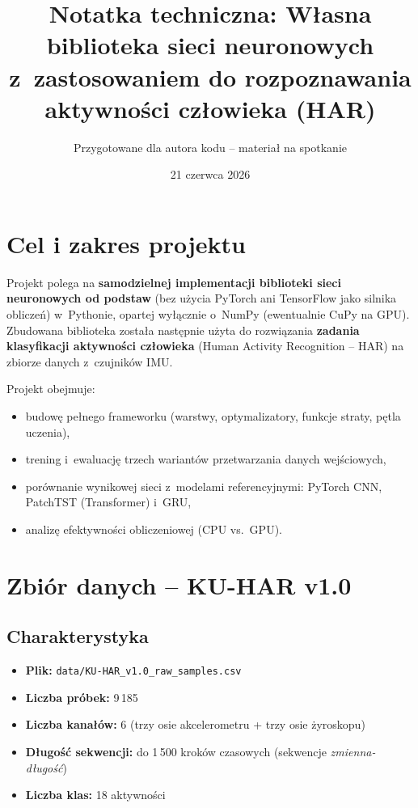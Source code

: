 \documentclass[12pt,a4paper]{article}
\title{\textbf{Notatka techniczna: Własna biblioteka sieci neuronowych\\
z~zastosowaniem do rozpoznawania aktywności człowieka (HAR)}}
\author{Przygotowane dla autora kodu -- materiał na spotkanie}
\date{21 czerwca 2026}
\begin{document}
\maketitle
\tableofcontents
\newpage

\section{Cel i zakres projektu}

Projekt polega na \textbf{samodzielnej implementacji biblioteki sieci neuronowych od podstaw} (bez użycia PyTorch ani TensorFlow jako silnika obliczeń) w~Pythonie, opartej wyłącznie o~NumPy (ewentualnie CuPy na GPU). Zbudowana biblioteka została następnie użyta do rozwiązania \textbf{zadania klasyfikacji aktywności człowieka} (Human Activity Recognition -- HAR) na zbiorze danych z~czujników IMU.

Projekt obejmuje:
\begin{itemize}
  \item budowę pełnego frameworku (warstwy, optymalizatory, funkcje straty, pętla uczenia),
  \item trening i~ewaluację trzech wariantów przetwarzania danych wejściowych,
  \item porównanie wynikowej sieci z~modelami referencyjnymi: PyTorch CNN, PatchTST (Transformer) i~GRU,
  \item analizę efektywności obliczeniowej (CPU vs.\ GPU).
\end{itemize}

\section{Zbiór danych -- KU-HAR v1.0}

\subsection{Charakterystyka}
\begin{itemize}
  \item \textbf{Plik:} \texttt{data/KU-HAR\_v1.0\_raw\_samples.csv}
  \item \textbf{Liczba próbek:} 9\,185
  \item \textbf{Liczba kanałów:} 6 (trzy osie akcelerometru + trzy osie żyroskopu)
  \item \textbf{Długość sekwencji:} do 1\,500 kroków czasowych (sekwencje \emph{zmienna-długość})
  \item \textbf{Liczba klas:} 18 aktywności
\end{itemize}
\end{document}
